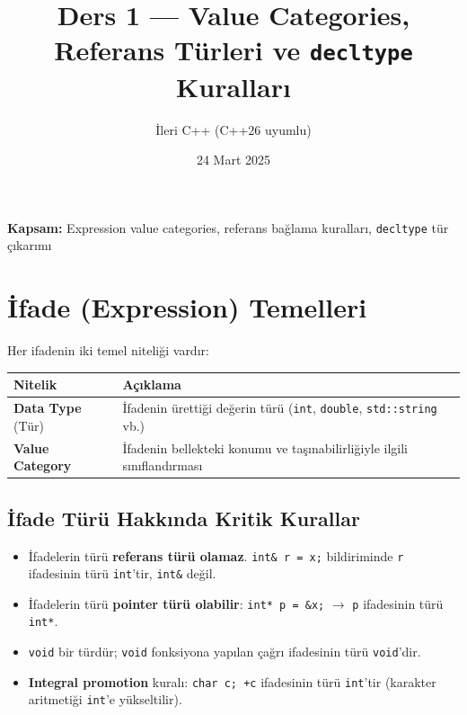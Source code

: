 \documentclass[a4paper,12pt]{article}
\title{\textbf{Ders 1 --- Value Categories, Referans Türleri ve \texttt{decltype} Kuralları}}
\author{İleri C++ (C++26 uyumlu)}
\date{24 Mart 2025}
\begin{document}
\maketitle

\noindent\textbf{Kapsam:} Expression value categories, referans bağlama kuralları, \texttt{decltype} tür çıkarımı

\tableofcontents
\newpage

\section{İfade (Expression) Temelleri}

Her ifadenin iki temel niteliği vardır:

\begin{table}[h]
\centering
\begin{tabular}{@{}ll@{}}
\toprule
\textbf{Nitelik} & \textbf{Açıklama} \\
\midrule
\textbf{Data Type} (Tür) & İfadenin ürettiği değerin türü (\texttt{int}, \texttt{double}, \texttt{std::string} vb.) \\
\textbf{Value Category} & İfadenin bellekteki konumu ve taşınabilirliğiyle ilgili sınıflandırması \\
\bottomrule
\end{tabular}
\end{table}

\subsection{İfade Türü Hakkında Kritik Kurallar}

\begin{itemize}
    \item İfadelerin türü \textbf{referans türü olamaz}. \texttt{int\& r = x;} bildiriminde \texttt{r} ifadesinin türü \texttt{int}'tir, \texttt{int\&} değil.
    \item İfadelerin türü \textbf{pointer türü olabilir}: \texttt{int* p = \&x;} $\rightarrow$ \texttt{p} ifadesinin türü \texttt{int*}.
    \item \texttt{void} bir türdür; \texttt{void} fonksiyona yapılan çağrı ifadesinin türü \texttt{void}'dir.
    \item \textbf{Integral promotion} kuralı: \texttt{char c; +c} ifadesinin türü \texttt{int}'tir (karakter aritmetiği \texttt{int}'e yükseltilir).
\end{itemize}
\end{document}
